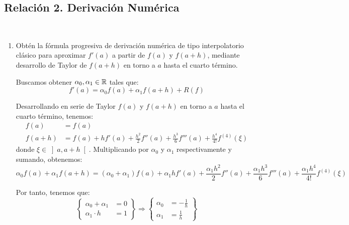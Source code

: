 \subsection{Relación 2. Derivación Numérica}
\setcounter{ejercicio}{0}


\begin{ejercicio}\label{ej:2.2.1}~
    \begin{enumerate}
        \item Obtén la fórmula progresiva de derivación numérica de tipo interpolatorio clásico para aproximar $f'(a)$ a partir de $f(a)$ y $f(a + h)$, mediante desarrollo de Taylor de $f(a + h)$ en torno a $a$ hasta el cuarto término.
        
        Buscamos obtener $\alpha_0,\alpha_1\in \mathbb{R}$ tales que:
        \begin{equation*}
            f'(a) = \alpha_0 f(a) + \alpha_1 f(a + h) + R(f)
        \end{equation*}

        Desarrollando en serie de Taylor $f(a)$ y $f(a + h)$ en torno a $a$ hasta el cuarto término, tenemos:
        \begin{align*}
            f(a) &= f(a) \\
            f(a + h) &= f(a) + hf'(a) + \frac{h^2}{2}f''(a) + \frac{h^3}{6}f'''(a) + \frac{h^4}{4!}f^{(4)}(\xi)
        \end{align*}
        donde $\xi\in\left]a,a+h\right[$. Multiplicando por $\alpha_0$ y $\alpha_1$ respectivamente y sumando, obtenemos:
        \begin{equation*}
            \alpha_0 f(a) + \alpha_1 f(a + h) = (\alpha_0 + \alpha_1)f(a) + \alpha_1hf'(a) + \frac{\alpha_1h^2}{2}f''(a) + \frac{\alpha_1h^3}{6}f'''(a) + \frac{\alpha_1h^4}{4!}f^{(4)}(\xi)
        \end{equation*}

        Por tanto, tenemos que:
        \begin{equation*}
            \left\{\begin{aligned}
                \alpha_0 + \alpha_1 &= 0 \\
                \alpha_1\cdot h &= 1
            \end{aligned}\right\}
            \Longrightarrow
            \left\{\begin{aligned}
                \alpha_0 &= -\frac{1}{h} \\
                \alpha_1 &= \frac{1}{h}
            \end{aligned}\right\}
        \end{equation*}


\end{enumerate}
\end{ejercicio}
